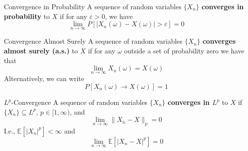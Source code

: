 \begin{definition}[]{Convergence in Probability}{}
	A sequence of random variables $\{ X_n \}$ \textbf{converges in probability} to $X$ if for any $\varepsilon > 0$, we have
	\[
		\lim_{n \to \infty} P[|X_n(\omega) - X(\omega)| > \varepsilon] = 0
	\]
\end{definition}

\begin{definition}[]{Convergence Almost Surely}{}
	A sequence of random variables $\{ X_n \}$ \textbf{converges almost surely (a.s.)} to $X$ if for any $\omega$ outside a set of probability zero we have that
	\[
		\lim_{n \to \infty} X_n(\omega) = X(\omega)
	\]
	Alternatively, we can write
	\[
		P[X_n(\omega) \to X(\omega)] = 1
	\]
\end{definition}

\begin{definition}[]{$L^p$-Convergence}{}
	A sequence of random variables $\{ X_n \}$ \textbf{converges in $L^p$} to $X$ if $\{X_n\} \subseteq L^p$, $p \in [1,\infty)$, and
	\[
		\lim_{n \to \infty} \|X_n - X\|_p = 0
	\]
	I.e., $\mathbb{E} \left[ |X_n|^p \right] < \infty$ and
	\[
		\lim_{n \to \infty} \mathbb{E} \left[ |X_n - X|^p \right] = 0
	\]
\end{definition}